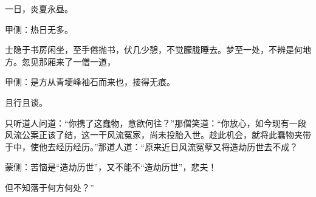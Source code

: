 \begin{parag}
    一日，炎夏永昼。\begin{note}甲侧：热日无多。\end{note}士隐于书房闲坐，至手倦抛书，伏几少憩，不觉朦胧睡去。梦至一处，不辨是何地方。忽见那厢来了一僧一道，\begin{note}甲侧：是方从青埂峰袖石而来也，接得无痕。\end{note}且行且谈。
\end{parag}


\begin{parag}
    只听道人问道：“你携了这蠢物，意欲何往？”那僧笑道：“你放心，如今现有一段风流公案正该了结，这一干风流冤家，尚未投胎入世。趁此机会，就将此蠢物夹带于中，使他去经历经历。”那道人道：“原来近日风流冤孽又将造劫历世去不成？\begin{note}蒙侧：苦恼是“造劫历世”，又不能不“造劫历世”，悲夫！\end{note}但不知落于何方何处？”
\end{parag}


